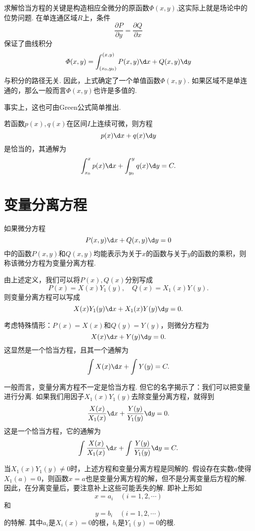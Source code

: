 \documentclass[lang=cn,10pt]{elegantbook}
\begin{document}
\begin{remark}
	求解恰当方程的关键是构造相应全微分的原函数$\varPhi(x,y)$,这实际上就是场论中的位势问题. 在单连通区域$R$上，条件
	$$\frac{\partial P}{\partial y}=\frac{\partial Q}{\partial x}$$
	保证了曲线积分
	$$\varPhi(x,y)=\int_{(x_0,y_0)}^{(x,y)}P(x,y)\d x+Q(x,y)\d y$$
	与积分的路径无关. 因此，上式确定了一个单值函数$\varPhi(x,y)$. 如果区域不是单连通的，那么一般而言$\varPhi(x,y)$也许是多值的.
\end{remark}
\begin{remark}
	事实上，这也可由Green公式简单推出.
\end{remark}
\begin{proposition}
	若函数$p(x),q(x)$在区间$I$上连续可微，则方程
	$$p(x)\d x+q(x)\d y$$
	是恰当的，其通解为
	$$\int_{x_0}^{x}p(x)\d x+\int_{y_0}^{y}q(x)\d y=C.$$
\end{proposition}
\section{变量分离方程}
\begin{definition}[变量分离方程]
	如果微分方程
	$$P(x,y)\d x+Q(x,y)\d y=0$$
	中的函数$P(x,y)$和$Q(x,y)$均能表示为关于$x$的函数与关于$y$的函数的乘积，则称该微分方程为{\heiti 变量分离方程}.
\end{definition}
由上述定义，我们可以将$P(x),Q(x)$分别写成
$$P(x)=X(x)Y_1(y),\quad Q(x)=X_1(x)Y(y).$$
则变量分离方程可以写成
$$X(x)Y_1(y)\d x+X_1(x)Y(y)\d y=0.$$

考虑特殊情形：$P(x)=X(x)$和$Q(y)=Y(y)$，则微分方程为
$$X(x)\d x+Y(y)\d y=0.$$
这显然是一个恰当方程，且其一个通解为
$$\int X(x)\d x+\int Y(y)=C.$$

一般而言，变量分离方程不一定是恰当方程. 但它的名字揭示了：我们可以把变量进行分离. 如果我们用因子$X_1(x)Y_1(y)$去除变量分离方程，就得到
$$\frac{X(x)}{X_1(x)}\d x+\frac{Y(y)}{Y_1(y)}\d y=0.$$
这是一个恰当方程，它的通解为
$$\int \frac{X(x)}{X_1(x)}\d x+\int \frac{Y(y)}{Y_1(y)}\d y=C.$$

当$X_1(x)Y_1(y)\neq 0$时，上述方程和变量分离方程是同解的. 假设存在实数$a$使得$X_1(a)=0$，则函数$x=a$也是变量分离方程的解，但不是分离变量后方程的解. 因此，在分离变量后，{\heiti 要注意补上这些可能丢失的解}. 即补上形如
$$x=a_i\quad (i=1,2,\cdots)$$
和
$$y=b_i\quad (i=1,2,\cdots)$$
的特解. 其中$a_i$是$X_i(x)=0$的根，$b_i$是$Y_1(y)=0$的根.
\end{document}
